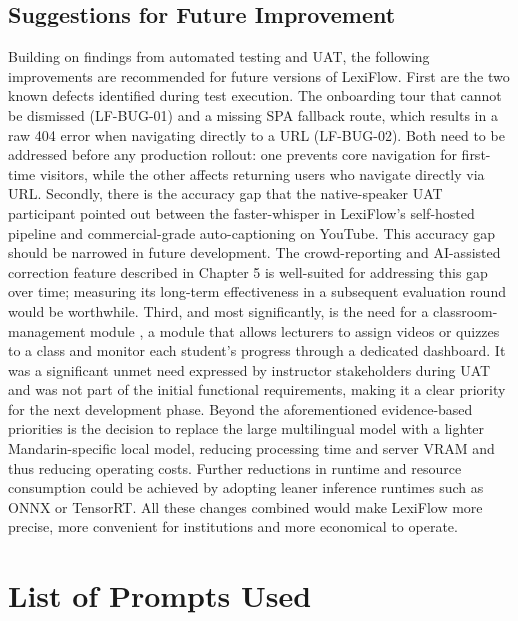 \documentclass[oneside]{utmthesis}
\begin{document}
\section{Suggestions for Future Improvement}Building on findings from automated testing and UAT, the following improvements are recommended for future versions of LexiFlow. First are the two known defects identified during test execution. The onboarding tour that cannot be dismissed (LF-BUG-01) and a missing SPA fallback route, which results in a raw 404 error when navigating directly to a URL (LF-BUG-02). Both need to be addressed before any production rollout: one prevents core navigation for first-time visitors, while the other affects returning users who navigate directly via URL. Secondly, there is the accuracy gap that the native-speaker UAT participant pointed out between the faster-whisper in LexiFlow's self-hosted pipeline and commercial-grade auto-captioning on YouTube. This accuracy gap should be narrowed in future development. The crowd-reporting and AI-assisted correction feature described in Chapter 5 is well-suited for addressing this gap over time; measuring its long-term effectiveness in a subsequent evaluation round would be worthwhile. Third, and most significantly, is the need for a classroom-management module , a module that allows lecturers to assign videos or quizzes to a class and monitor each student's progress through a dedicated dashboard. It was a significant unmet need expressed by instructor stakeholders during UAT and was not part of the initial functional requirements, making it a clear priority for the next development phase. Beyond the aforementioned evidence-based priorities is the decision to replace the large multilingual model with a lighter Mandarin-specific local model, reducing processing time and server VRAM and thus reducing operating costs. Further reductions in runtime and resource consumption could be achieved by adopting leaner inference runtimes such as ONNX or TensorRT. All these changes combined would make LexiFlow more precise, more convenient for institutions and more economical to operate.


\appendix



\chapter{List of Prompts Used}

\end{document}
